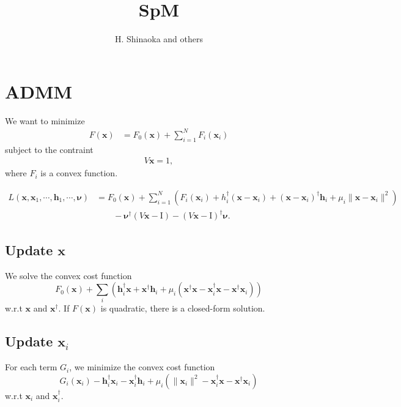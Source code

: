 \documentclass[11pt]{article}
\title{SpM}
\author{H. Shinaoka and others}
\newcommand{\bx}{\ensuremath{\boldsymbol{x}}}
\newcommand{\bnu}{\ensuremath{\boldsymbol{\nu}}}
\newcommand{\bh}{\ensuremath{\boldsymbol{h}}}
\begin{document}
\maketitle

\section{ADMM}

We want to minimize
\begin{align}
    F(\bx) &= F_0(\bx) + \sum_{i=1}^{N} F_i(\bx_i)
\end{align}
subject to the contraint
\begin{align}
    V \bx = 1,
\end{align}
where $F_i$ is a convex function.

\begin{align}
    L(\bx, \bx_1, \cdots, \bh_1, \cdots, \bnu) &=
        F_0(\bx) + \sum_{i=1}^N \left(F_i (\bx_i) 
           + h_i^\dagger (\bx - \bx_i) 
           + (\bx - \bx_i)^\dagger \bh_i
           + \mu_i\|\bx - \bx_i\|^2\right)\nonumber\\
    & \hspace{2em} - \bnu^\dagger (V\bx - \mathrm{I}) 
                   - (V\bx - \mathrm{I})^\dagger \bnu.
\end{align}

\subsection{Update $\bx$}
We solve the convex cost function
\begin{equation}
    F_0(\bx) + \sum_i\left( \bh_i^\dagger \bx + \bx^\dagger \bh_i  
       + \mu_i(\bx^\dagger \bx - \bx_i^\dagger \bx - \bx^\dagger \bx_i)\right)
\end{equation}
w.r.t $\bx$ and $\bx^\dagger$. If $F(\bx)$ is quadratic, there is a closed-form solution.

\subsection{Update $\bx_i$}
For each term $G_i$, we minimize the convex cost function
\begin{equation}
    G_i(\bx_i) 
        - \bh_i^\dagger \bx_i
        - \bx_i^\dagger \bh_i
        + \mu_i(\|\bx_i\|^2 - \bx_i^\dagger \bx - \bx^\dagger \bx_i)
\end{equation}
w.r.t $\bx_i$ and $\bx_i^\dagger$.
\end{document}
